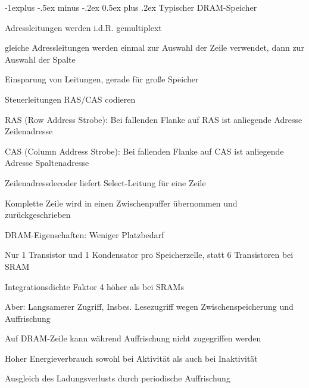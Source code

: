 \documentclass[10pt,landscape]{article}
\makeatletter
\renewcommand{\subsection}{\@startsection{subsection}{2}{0mm}%
                                {-1explus -.5ex minus -.2ex}%
                                {0.5ex plus .2ex}%
                                {\normalfont\normalsize\bfseries}}
\makeatother
\begin{document}
\begin{multicols}{3}
  \subsection{Typischer DRAM-Speicher}
  \begin{itemize*}
    \item Adressleitungen werden i.d.R. gemultiplext
    \item gleiche Adressleitungen werden einmal zur Auswahl der Zeile verwendet, dann zur Auswahl der Spalte
    \item Einsparung von Leitungen, gerade für große Speicher
    \item Steuerleitungen RAS/CAS codieren
    \item RAS (Row Address Strobe): Bei fallenden Flanke auf RAS ist anliegende Adresse Zeilenadresse
    \item CAS (Column Address Strobe): Bei fallenden Flanke auf CAS ist anliegende Adresse Spaltenadresse
    \item Zeilenadressdecoder liefert Select-Leitung für eine Zeile
    \item Komplette Zeile wird in einen Zwischenpuffer übernommen und zurückgeschrieben
    \item DRAM-Eigenschaften: Weniger Platzbedarf
    \item Nur 1 Transistor und 1 Kondensator pro Speicherzelle, statt 6 Transistoren bei SRAM
    \item Integrationsdichte Faktor 4 höher als bei SRAMs
    \item Aber: Langsamerer Zugriff, Insbes. Lesezugriff wegen Zwischenspeicherung und Auffrischung
    \item Auf DRAM-Zeile kann während Auffrischung nicht zugegriffen werden
    \item Hoher Energieverbrauch sowohl bei Aktivität als auch bei Inaktivität
    \item Ausgleich des Ladungsverlusts durch periodische Auffrischung
  \end{itemize*}
  


\end{multicols}
\end{document}
